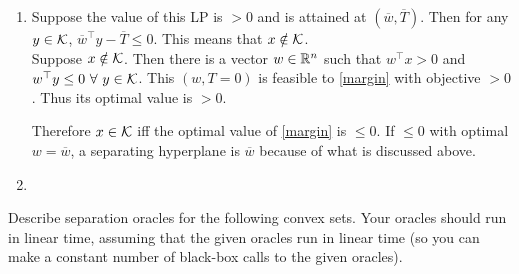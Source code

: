 \begin{enumerate}[label = (\alph*)]
\item Suppose the value of this LP is $>0$ and is attained at $(\overline w,\overline T)$. Then for any $y\in{\mathcal{K}}$, $\overline w^{\top}y-\overline T \le 0$. This means that $x\notin {\mathcal{K}}$.\\
Suppose $x\notin {\mathcal{K}}$. Then there is a vector $w\in \mathbb{R}^{n}$ such that $w^{\top}x > 0$ and $w^{\top}y\le 0~\forall~ y\in {\mathcal{K}}$. This $(w,T=0)$ is feasible to \ref{margin} with objective $>0$. Thus its optimal value is $>0$.

Therefore $x\in {\mathcal{K}}$ iff the optimal value of \ref{margin} is $\le 0$. If $\le 0$ with optimal $w=\overline w$, a separating hyperplane is $\overline w$ because of what is discussed above.

\item 
\end{enumerate}














\newpage
\pb
Describe separation oracles for the following convex sets. Your oracles should run in linear time, assuming that the given oracles run in linear time (so you can make a constant number of black-box calls to the given oracles).

\soln







\newpage
\pb






\soln



\newpage
\pb



\soln







